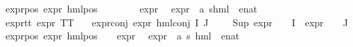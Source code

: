 \begin{isabellebody}
expr{\isacharunderscore}{\kern0pt}{}{\isacharunderscore}{\kern0pt}pos{\isacharcolon}{\kern0pt}\ {\isacartoucheopen}expr{\isacharunderscore}{\kern0pt}{}\ {\isacharparenleft}{\kern0pt}hml{\isacharunderscore}{\kern0pt}pos\ {\isasymalpha}\ {\isasymphi}{\isacharparenright}{\kern0pt}\ {\isacharequal}{\kern0pt}\ \isanewline
\ \ {}\ {\isacharplus}{\kern0pt}\ {\isacharparenleft}{\kern0pt}expr{\isacharunderscore}{\kern0pt}{}\ {\isasymphi}{\isacharparenright}{\kern0pt}{\isacartoucheclose}\isanewline
\isanewline
{}\isamarkupfalse%
\ expr{\isacharunderscore}{\kern0pt}{}\ {\isacharcolon}{\kern0pt}{\isacharcolon}{\kern0pt}\ {\isachardoublequoteopen}{\isacharparenleft}{\kern0pt}{\isacharprime}{\kern0pt}a{\isacharcomma}{\kern0pt}\ {\isacharprime}{\kern0pt}s{\isacharparenright}{\kern0pt}hml\ {\isasymRightarrow}\ enat{\isachardoublequoteclose}\isanewline
\ \ \isanewline
expr{\isacharunderscore}{\kern0pt}{}{\isacharunderscore}{\kern0pt}tt{\isacharcolon}{\kern0pt}\ {\isacartoucheopen}expr{\isacharunderscore}{\kern0pt}{}\ TT\ {\isacharequal}{\kern0pt}\ {}{\isacartoucheclose}\ {\isacharbar}{\kern0pt}\isanewline
expr{\isacharunderscore}{\kern0pt}{}{\isacharunderscore}{\kern0pt}conj{\isacharcolon}{\kern0pt}\ {\isacartoucheopen}expr{\isacharunderscore}{\kern0pt}{}\ {\isacharparenleft}{\kern0pt}hml{\isacharunderscore}{\kern0pt}conj\ I\ J\ {\isasymPhi}{\isacharparenright}{\kern0pt}\ {\isacharequal}{\kern0pt}\ {}\ {\isacharplus}{\kern0pt}\ Sup\ {\isacharparenleft}{\kern0pt}{\isacharparenleft}{\kern0pt}expr{\isacharunderscore}{\kern0pt}{}\ {\isasymcirc}\ {\isasymPhi}{\isacharparenright}{\kern0pt}\ {\isacharbackquote}{\kern0pt}\ I\ {\isasymunion}\ {\isacharparenleft}{\kern0pt}expr{\isacharunderscore}{\kern0pt}{}\ {\isasymcirc}\ {\isasymPhi}{\isacharparenright}{\kern0pt}\ {\isacharbackquote}{\kern0pt}\ J{\isacharparenright}{\kern0pt}{\isacartoucheclose}\ {\isacharbar}{\kern0pt}\isanewline
expr{\isacharunderscore}{\kern0pt}{}{\isacharunderscore}{\kern0pt}pos{\isacharcolon}{\kern0pt}\ {\isacartoucheopen}expr{\isacharunderscore}{\kern0pt}{}\ {\isacharparenleft}{\kern0pt}hml{\isacharunderscore}{\kern0pt}pos\ {\isasymalpha}\ {\isasymphi}{\isacharparenright}{\kern0pt}\ {\isacharequal}{\kern0pt}\ expr{\isacharunderscore}{\kern0pt}{}\ {\isasymphi}{\isacartoucheclose}\isanewline
\isanewline
{}\isamarkupfalse%
\ expr{\isacharunderscore}{\kern0pt}{}\ {\isacharcolon}{\kern0pt}{\isacharcolon}{\kern0pt}\ {\isachardoublequoteopen}{\isacharparenleft}{\kern0pt}{\isacharprime}{\kern0pt}a{\isacharcomma}{\kern0pt}\ {\isacharprime}{\kern0pt}s{\isacharparenright}{\kern0pt}\ hml\ {\isasymRightarrow}\ enat{\isachardoublequoteclose}\isanewline

\end{isabellebody}
